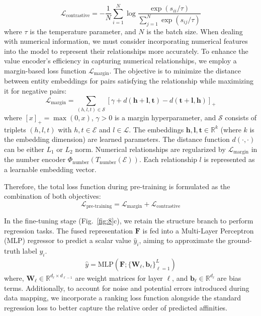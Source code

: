 \documentclass[unnumsec,webpdf,contemporary,large]{oup-authoring-template}%
\theoremstyle{thmstyleone}%
\theoremstyle{thmstyletwo}%
\theoremstyle{thmstylethree}%
\begin{document}
\begin{equation}
\mathcal{L}_\text{contrastive} = - \frac{1}{N} \sum_{i=1}^{N} \log \frac{\exp(s_{ii} / \tau)}{\sum_{j=1}^{N} \exp(s_{ij} / \tau)}
\end{equation}
where $\tau$ is the temperature parameter, and $N$ is the batch size. When dealing with numerical information, we must consider incorporating numerical features into the model to represent their relationships more accurately. To enhance the value encoder's efficiency in capturing numerical relationships, we employ a margin-based loss function $\mathcal{L}_\text{margin}$. The objective is to minimize the distance between entity embeddings for pairs satisfying the relationship while maximizing it for negative pairs:
\begin{equation}
\mathcal{L}_\text{margin} = \sum_{(h,l,t) \in \mathcal{S}} \left[ \gamma + d(\mathbf{h} + \mathbf{l}, \mathbf{t}) - d(\mathbf{t} + \mathbf{l}, \mathbf{h}) \right]_+
\end{equation}
where $[x]_+ = \max(0,x)$, $\gamma > 0$ is a margin hyperparameter, and $\mathcal{S}$ consists of triplets $(h,l,t)$ with $h,t \in \mathcal{E}$ and $l \in \mathcal{L}$. The embeddings $\mathbf{h}, \mathbf{l}, \mathbf{t} \in \mathbb{R}^k$ (where $k$ is the embedding dimension) are learned parameters. The distance function $d(\cdot,\cdot)$ can be either $L_1$ or $L_2$ norm. Numerical relationships are regularized by $\mathcal{L}_{\text{margin}}$ in the number encoder $\Phi_{\text{number}}(T_{\text{number}}(\mathcal{E}))$. Each relationship $l$ is represented as a learnable embedding vector.

Therefore, the total loss function during pre-training is formulated as the combination of both objectives:
\begin{equation}
\mathcal{L}_\text{pre-training} = \mathcal{L}_\text{margin} + \mathcal{L}_\text{contrastive}
\end{equation}


In the fine-tuning stage (Fig.~\ref{fig:8}c), we retain the structure branch to perform regression tasks. The fused representation $\mathbf{F}$ is fed into a Multi-Layer Perceptron (MLP) regressor to predict a scalar value $\hat{y}_i$, aiming to approximate the ground-truth label $y_i$. 
\begin{align}
\hat{y} = \text{MLP}(\mathbf{F}; \{\mathbf{W}_\ell, \mathbf{b}_\ell\}_{\ell=1}^L)
\end{align}
where, $\mathbf{W}_\ell \in \mathbb{R}^{d_\ell \times d_{\ell-1}}$ are weight matrices for layer $\ell$, and $\mathbf{b}_\ell \in \mathbb{R}^{d_\ell}$ are bias terms. Additionally, to account for noise and potential errors introduced during data mapping, we incorporate a ranking loss function alongside the standard regression loss to better capture the relative order of predicted affinities. 
\end{document}
